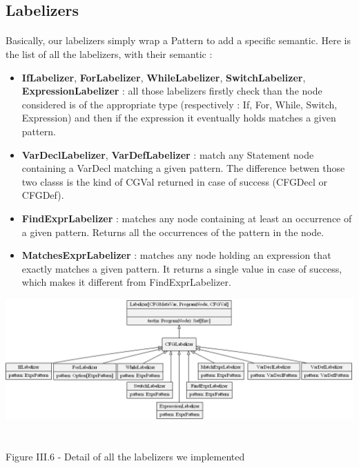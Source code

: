 \documentclass{report}
\begin{document}
\subsection* {Labelizers}
\paragraph{}
\hspace{4mm}Basically, our labelizers simply wrap a Pattern to add a specific semantic. Here is the list of all the labelizers, with their semantic :

\vspace{1.5mm}
\begin{itemize}
\item \textbf{IfLabelizer}, \textbf{ForLabelizer}, \textbf{WhileLabelizer}, \textbf{SwitchLabelizer}, \textbf{ExpressionLabelizer} :
all those labelizers firstly check than the node considered is of the appropriate type (respectively : If, For, While, Switch, Expression) and then if the expression
it eventually holds matches a given pattern.\vspace{1mm}
\item \textbf{VarDeclLabelizer}, \textbf{VarDefLabelizer} : match any Statement node containing a VarDecl matching a given pattern. The difference betwen those two classs is the kind of CGVal returned
in case of success (CFGDecl or CFGDef).\vspace{1mm}
\item \textbf{FindExprLabelizer} : matches any node containing at least an occurrence of a given pattern. Returns all the occurrences of the pattern in the node.\vspace{1mm}
\item \textbf{MatchesExprLabelizer} : matches any node holding an expression that exactly matches a given pattern. It returns a single value in case of success, which makes it different from FindExprLabelizer.\vspace{1mm}
\end{itemize}

\begin{center}
\includegraphics[scale=0.55]{data/labels.png}
~\\~\\Figure III.6 - Detail of all the labelizers we implemented
\end{center}
\end{document}
